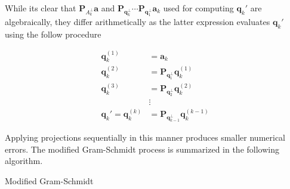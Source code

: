 While its clear that $\bm{P}_{A_{k}^{\perp}} \bm{a} $ and $\bm{P}_{\bm{q}_{k}^{\perp}} \cdots \bm{P}_{\bm{q}_{1}^{\perp}} \bm{a}_k$ used for computing $\bm{q}_k'$ are algebraically, they differ arithmetically as the latter expression evaluates $\bm{q}_k'$ using the follow procedure

\begin{align*}
    \bm{q}_k^{(1)}             & = \bm{a}_k                                       \\
    \bm{q}_k^{(2)}             & = \bm{P}_{\bm{q}_{1}^{\perp}} \bm{q}_k^{(1)}     \\
    \bm{q}_k^{(3)}             & = \bm{P}_{\bm{q}_{2}^{\perp}} \bm{q}_k^{(2)}     \\
                               & \vdots                                           \\
    \bm{q}_k' = \bm{q}_k^{(k)} & = \bm{P}_{\bm{q}_{k-1}^{\perp}} \bm{q}_k^{(k-1)}
\end{align*}

Applying projections sequentially in this manner produces smaller numerical errors. The modified Gram-Schmidt process is summarized in the following algorithm.

    {\centering
        \begin{minipage}{.85\linewidth}
            \begin{algorithm}[H]
                \caption{Modified Gram-Schmidt}
                \label{alg: Modified_Gram-Schmidt}
                \SetAlgoLined
                \DontPrintSemicolon

                \BlankLine
                \BlankLine
            \end{algorithm}
        \end{minipage}
        \par
    }